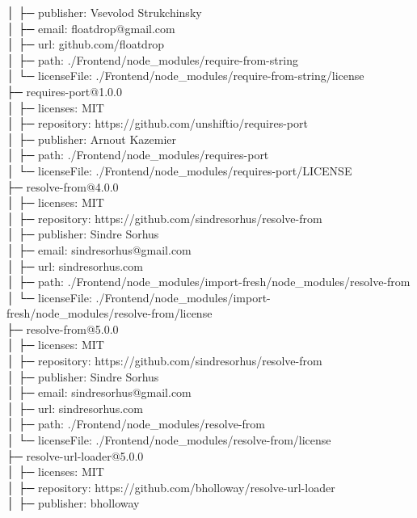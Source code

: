│  ├─ publisher: Vsevolod Strukchinsky\\
│  ├─ email: floatdrop@gmail.com\\
│  ├─ url: github.com/floatdrop\\
│  ├─ path: ./Frontend/node\_modules/require-from-string\\
│  └─ licenseFile: ./Frontend/node\_modules/require-from-string/license\\
├─ requires-port@1.0.0\\
│  ├─ licenses: MIT\\
│  ├─ repository: https://github.com/unshiftio/requires-port\\
│  ├─ publisher: Arnout Kazemier\\
│  ├─ path: ./Frontend/node\_modules/requires-port\\
│  └─ licenseFile: ./Frontend/node\_modules/requires-port/LICENSE\\
├─ resolve-from@4.0.0\\
│  ├─ licenses: MIT\\
│  ├─ repository: https://github.com/sindresorhus/resolve-from\\
│  ├─ publisher: Sindre Sorhus\\
│  ├─ email: sindresorhus@gmail.com\\
│  ├─ url: sindresorhus.com\\
│  ├─ path: ./Frontend/node\_modules/import-fresh/node\_modules/resolve-from\\
│  └─ licenseFile: ./Frontend/node\_modules/import-fresh/node\_modules/resolve-from/license\\
├─ resolve-from@5.0.0\\
│  ├─ licenses: MIT\\
│  ├─ repository: https://github.com/sindresorhus/resolve-from\\
│  ├─ publisher: Sindre Sorhus\\
│  ├─ email: sindresorhus@gmail.com\\
│  ├─ url: sindresorhus.com\\
│  ├─ path: ./Frontend/node\_modules/resolve-from\\
│  └─ licenseFile: ./Frontend/node\_modules/resolve-from/license\\
├─ resolve-url-loader@5.0.0\\
│  ├─ licenses: MIT\\
│  ├─ repository: https://github.com/bholloway/resolve-url-loader\\
│  ├─ publisher: bholloway\\
